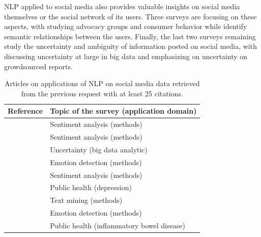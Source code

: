 NLP applied to social media also provides valuable insights on social media themselves or the social network of its users.
Three surveys are focusing on these aspects, with \textcite{bailCombiningNaturalLanguage2016} studying advocacy groups and \textcite{vazquezClassificationUsergeneratedContent2014} consumer behavior while \textcite{bontchevaMakingSenseSocial2014} identify semantic relationships between the users.
Finally, the last two surveys remaining study the uncertainty and ambiguity of information posted on social media, with \textcite{haririUncertaintyBigData2019} discussing uncertainty at large in big data and \textcite{linUncertaintyAnalysisCrowdsourced2015} emphasizing on uncertainty on growdsourced reports.

\begin{table}[hbtp]
    \centering
    \tabulinesep=1.2mm
    \caption{Articles on applications of NLP on social media data retrieved from the previous request with at least 25 citations.}
    \begin{tabu} to \textwidth {X[1,m]X[3,m]}
        Reference                                                & Topic of the survey  (application domain)   \\ [0.5ex]
        \toprule
        \textcite{yadavSentimentAnalysisUsing2020}               & Sentiment analysis (methods)                \\
        \textcite{hemmatianSurveyClassificationTechniques2019}   & Sentiment analysis (methods)                \\
        \textcite{haririUncertaintyBigData2019}                  & Uncertainty (big data analytic)             \\
        \textcite{sailunazEmotionDetectionText2018}              & Emotion detection (methods)                 \\
        \textcite{chaturvediDistinguishingFactsOpinions2018}     & Sentiment analysis (methods)                \\
        \textcite{yazdavarSemiSupervisedApproachMonitoring2017}  & Public health (depression)                  \\
        \textcite{salloumSurveyTextMining2017}                   & Text mining (methods)                       \\
        \textcite{poriaReviewAffectiveComputing2017}             & Emotion detection (methods)                 \\
        \textcite{martinezPatientUnderstandingRisks2017}         & Public health (inflammatory bowel disease)  \\

\end{tabu}
\end{table}
